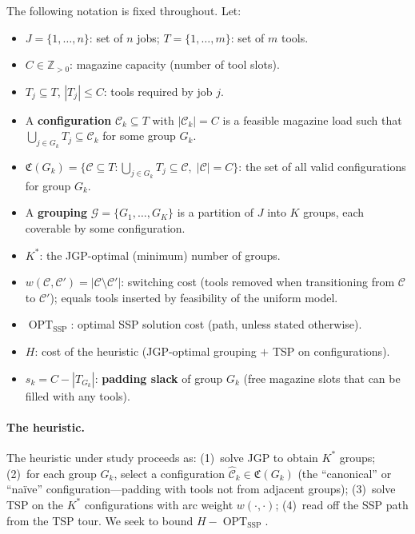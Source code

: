 \documentclass[11pt,a4paper]{article}
\theoremstyle{plain}
\theoremstyle{definition}
\DeclareMathOperator{\OPT}{OPT}
\newcommand{\Cconf}{\mathfrak{C}}   %
\newcommand{\calG}{\mathcal{G}}     %
\newcommand{\Heur}{H}               %
\newcommand{\Kstar}{K^{*}}          %
\newcommand{\sswitch}[2]{w(#1,#2)}  %
\begin{document}
\noindent The following notation is fixed throughout. Let:
\begin{itemize}
  \item $J = \{1,\ldots,n\}$: set of $n$ jobs; \quad $T = \{1,\ldots,m\}$: set of $m$ tools.
  \item $C \in \mathbb{Z}_{>0}$: magazine capacity (number of tool slots).
  \item $T_j \subseteq T$, $|T_j| \le C$: tools required by job $j$.
  \item A \textbf{configuration} $\mathcal{C}_k \subseteq T$ with $|\mathcal{C}_k|=C$ is a feasible
        magazine load such that $\bigcup_{j \in G_k} T_j \subseteq \mathcal{C}_k$ for some group $G_k$.
  \item $\Cconf(G_k) = \bigl\{\mathcal{C} \subseteq T : \bigcup_{j \in G_k} T_j \subseteq \mathcal{C},\;
        |\mathcal{C}|=C\bigr\}$: the set of all valid configurations for group $G_k$.
  \item A \textbf{grouping} $\calG = \{G_1,\ldots,G_K\}$ is a partition of $J$ into $K$ groups,
        each coverable by some configuration.
  \item $\Kstar$: the JGP-optimal (minimum) number of groups.
  \item $\sswitch{\mathcal{C}}{\mathcal{C}'} = |\mathcal{C} \setminus \mathcal{C}'|$: switching cost (tools
        removed when transitioning from $\mathcal{C}$ to $\mathcal{C}'$); equals tools inserted by
        feasibility of the uniform model.
  \item $\OPT_{\text{SSP}}$: optimal SSP solution cost (path, unless stated otherwise).
  \item $\Heur$: cost of the heuristic (JGP-optimal grouping $+$ TSP on configurations).
  \item $s_k = C - |T_{G_k}|$: \textbf{padding slack} of group $G_k$ (free magazine slots
        that can be filled with any tools).
\end{itemize}

\paragraph{The heuristic.}
The heuristic under study proceeds as:
(1)~solve JGP to obtain $\Kstar$ groups;
(2)~for each group $G_k$, select a configuration $\hat{\mathcal{C}}_k \in \Cconf(G_k)$
(the ``canonical'' or ``naïve'' configuration---padding with tools not from adjacent groups);
(3)~solve TSP on the $\Kstar$ configurations with arc weight $\sswitch{\cdot}{\cdot}$;
(4)~read off the SSP path from the TSP tour.
We seek to bound $\Heur - \OPT_{\text{SSP}}$.
\end{document}
